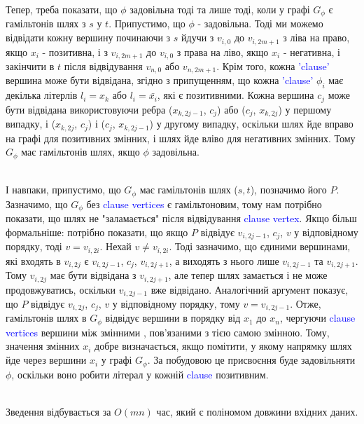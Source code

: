 \documentclass[14pt]{article}
\begin{document}
\begin{spacing}{1.175}
    \quad Тепер, треба показати, що \(\phi\) задовільна тоді та лише тоді, коли у графі \(G_{\phi}\) є гамільтонів шлях з \(s\) у \(t\). Припустимо, що \(\phi\) - задовільна. Тоді ми можемо відвідати кожну вершину починаючи з \(s\) йдучи з \(v_{i,0}\) до \(v_{i,2m+1}\) з ліва на право, якщо \(x_i\) - позитивна, і з \(v_{i,2m+1}\) до \(v_{i,0}\) з права на ліво, якщо \(x_i\) - негативна, і закінчити в \(t\) після відвідування \(v_{n,0}\) або \(v_{n,2m+1}\). Крім того, кожна \textcolor{blue}{'clause'} вершина може бути відвідана, згідно з припущенням, що кожна \textcolor{blue}{'clause'} \(\phi_{i}\) має декілька літерлів \(l_i = x_k\) або \(l_i = \bar{x_i}\), які є позитивними. Кожна вершина \(c_j\) може бути відвідана використовуючи ребра (\(x_{k,2j-1}\), \(c_{j}\)) або (\(c_{j}\), \(x_{k,2j}\)) у першому випадку, і (\(x_{k,2j}\), \(c_{j}\)) і (\(c_{j}\), \(x_{k,2j-1}\)) у другому випадку, оскільки шлях йде вправо на графі для позитивних змінних, і шлях йде вліво для негативних змінних. Тому \(G_{\phi}\) має гамільтонів шлях, якщо \(\phi\) задовільна.
    
    \\
    \quad І навпаки, припустимо, що \(G_{\phi}\) має гамільтонів шлях (\(s, t\)), позначимо його \(P\). Зазначимо, що \(G_{\phi}\) без \textcolor{blue}{clause vertices}  є гамільтоновим, тому нам потрібно показати, що шлях не "заламається" після відвідування \textcolor{blue}{clause vertex}. Якщо більш формальніше: потрібно показати, що якщо \(P\) відвідує \(v_{i, 2j-1}\), \(c_j\), \(v\) у відповідному порядку, тоді \(v = v_{i,2i}\). Нехай \(v \neq v_{i,2i}\). Тоді зазначимо, що єдиними вершинами, які входять в \(v_{i,2j}\) є \(v_{i,2j-1}\), \(c_j\), \(v_{i,2j+1}\), а виходять з нього лише \(v_{i,2j-1}\) та \(v_{i,2j+1}\). Тому \(v_{i,2j}\) має бути відвідана з \(v_{i,2j+1}\), але тепер шлях замається і не може продовжуватись, оскільки \(v_{i,2j-1}\) вже відвідано. Аналогічний аргумент показує, що \(P\) відвідує \(v_{i, 2j}\), \(c_j\), \(v\) у відповідному порядку, тому \(v = v_{i,2j-1}\). Отже, гамільтонів шлях в \(G_{\phi}\) відвідує вершини в порядку від \(x_1\) до \(x_n\), чергуючи \textcolor{blue}{clause vertices} вершини між змінними , пов'язаними з тією самою змінною. Тому, значення змінних \(x_i\) добре визначається, якщо помітити, у якому напрямку шлях йде через вершини \(x_i\) у графі \(G_{\phi}\). За побудовою це присвоєння буде задовільняти \(\phi\), оскільки воно робити літерал у кожній \textcolor{blue}{clause} позитивним.
    
    \\
    \quad Зведення відбувається за \(O(mn)\) час, який є поліномом довжини вхідних даних.
    \\



\end{spacing}
\end{document}
